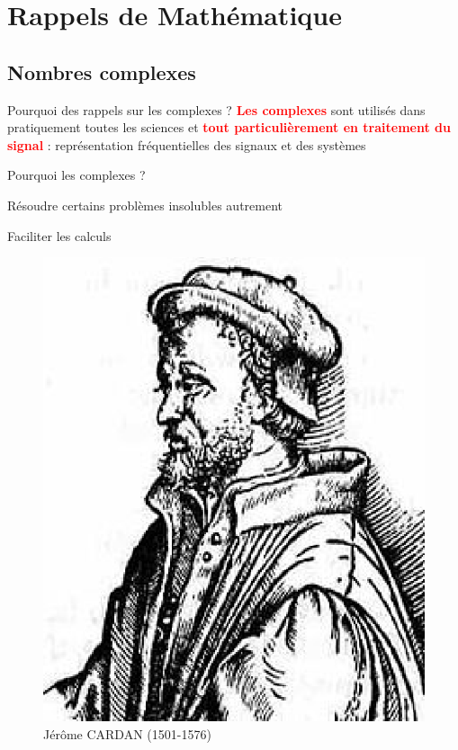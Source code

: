 \documentclass{beamer}
\begin{document}
\section{Rappels de Mathématique} 
\subsection{Nombres complexes}

\begin{frame}
\begin{block}{Pourquoi des rappels sur les complexes ?}
\justifying
\textbf{\textcolor{red}{Les complexes}} sont utilisés dans pratiquement toutes
les sciences et \textbf{\textcolor{red}{tout particulièrement en traitement du
signal}} : représentation fréquentielles des signaux et des systèmes
\end{block}
\pause
\begin{block}{Pourquoi les complexes ?}
	\itemize
	  \item Résoudre certains problèmes insolubles autrement
	  \item Faciliter les calculs
\end{block}
\center
\begin{figure}[hbp]
\begin{center}
  \includegraphics[scale=.25]{images/Cardano.eps}\\
  Jérôme CARDAN (1501-1576)
\end{center}
\end{figure}
\end{frame}
\end{document}
